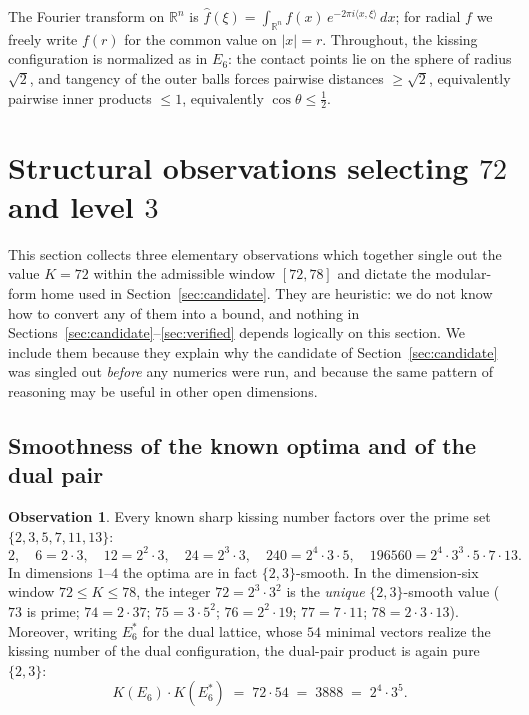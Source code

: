 \documentclass[11pt,reqno]{amsart}
\theoremstyle{plain}
\theoremstyle{definition}
\newtheorem{observation}[theorem]{Observation}
\theoremstyle{remark}
\newcommand{\R}{\mathbb{R}}
\newcommand{\fhat}[1]{\widehat{#1}}
\begin{document}
The Fourier transform on $\R^n$ is
$\fhat{f}(\xi)=\int_{\R^n}f(x)\,e^{-2\pi i\langle x,\xi\rangle}\,dx$;
for radial $f$ we freely write $f(r)$ for the common value on
$|x|=r$.  Throughout, the kissing configuration is normalized as in
$E_6$: the contact points lie on the sphere of radius $\sqrt2$, and
tangency of the outer balls forces pairwise distances $\ge\sqrt2$,
equivalently pairwise inner products $\le 1$, equivalently
$\cos\theta\le\tfrac12$.

\section{Structural observations selecting \texorpdfstring{$72$}{72}
and level \texorpdfstring{$3$}{3}}\label{sec:structural}

This section collects three elementary observations which together
single out the value $K=72$ within the admissible window
$[72,78]$ and dictate the modular-form home used in
Section~\ref{sec:candidate}.  They are heuristic: we do not know how
to convert any of them into a bound, and nothing in
Sections~\ref{sec:candidate}--\ref{sec:verified} depends logically on
this section.  We include them because they explain why the candidate
of Section~\ref{sec:candidate} was singled out \emph{before} any
numerics were run, and because the same pattern of reasoning may be
useful in other open dimensions.

\subsection{Smoothness of the known optima and of the dual pair}

\begin{observation}\label{obs:smooth}
Every known sharp kissing number factors over the prime set
$\{2,3,5,7,11,13\}$:
\[
2,\quad 6=2\cdot3,\quad 12=2^2\cdot3,\quad 24=2^3\cdot3,\quad
240=2^4\cdot3\cdot5,\quad 196560=2^4\cdot3^3\cdot5\cdot7\cdot13 .
\]
In dimensions $1$--$4$ the optima are in fact $\{2,3\}$-smooth.  In
the dimension-six window $72\le K\le 78$, the integer
$72=2^3\cdot3^2$ is the \emph{unique} $\{2,3\}$-smooth value
($73$ is prime; $74=2\cdot37$; $75=3\cdot5^2$; $76=2^2\cdot19$;
$77=7\cdot11$; $78=2\cdot3\cdot13$).  Moreover, writing $E_6^*$ for
the dual lattice, whose $54$ minimal vectors realize the kissing
number of the dual configuration, the dual-pair product is again pure
$\{2,3\}$:
\[
K(E_6)\cdot K(E_6^*)\;=\;72\cdot 54\;=\;3888\;=\;2^4\cdot3^5 .
\]
\end{observation}
\end{document}
